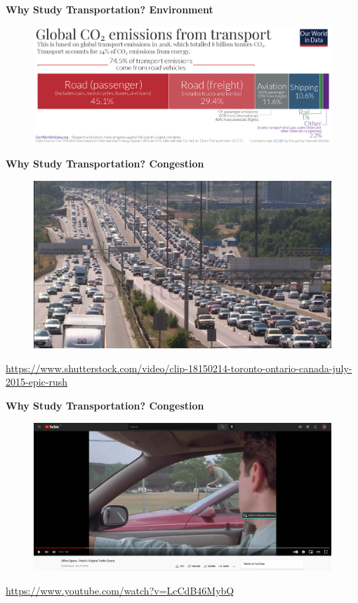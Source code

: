 \documentclass[aspectratio=169]{beamer}
\begin{document}
\begin{frame}
	\textbf{Why Study Transportation? Environment}
	\begin{figure}
		\centering
		\includegraphics[width=0.8\linewidth]{images/Transport-CO2-emissions-by-mode-bar-chart.png}
	\end{figure}
\end{frame}




\begin{frame}
	\textbf{Why Study Transportation? Congestion}
	\begin{figure}
		\centering
		\includegraphics[width=0.8\linewidth]{images/traffic_401.png}
	\end{figure}
	\tiny\url{https://www.shutterstock.com/video/clip-18150214-toronto-ontario-canada-july-2015-epic-rush}
\end{frame}


\begin{frame}
	\textbf{Why Study Transportation? Congestion}
	\begin{figure}
		\centering
		\includegraphics[width=0.8\linewidth]{images/office_space.png}
	\end{figure}
	\tiny\url{https://www.youtube.com/watch?v=LcCdB46MybQ}
\end{frame}
\end{document}
